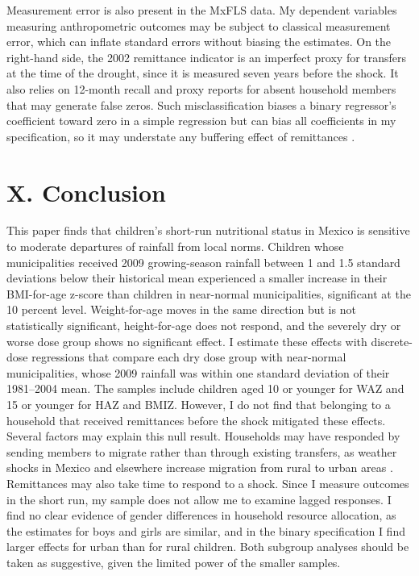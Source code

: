 \documentclass[12pt]{article}
\begin{document}
Measurement error is also present in the MxFLS data. My dependent variables measuring anthropometric outcomes may be subject to classical measurement error, which can inflate standard errors without biasing the estimates. On the right-hand side, the 2002 remittance indicator is an imperfect proxy for transfers at the time of the drought, since it is measured seven years before the shock. It also relies on 12-month recall and proxy reports for absent household members that may generate false zeros. Such misclassification biases a binary regressor's coefficient toward zero in a simple regression but can bias all coefficients in my specification, so it may understate any buffering effect of remittances \parencite{aignerRegressionBinaryIndependent1973}.

\section*{X. Conclusion}\label{sec:X}

This paper finds that children's short-run nutritional status in Mexico is sensitive to moderate departures of rainfall from local norms. Children whose municipalities received 2009 growing-season rainfall between 1 and 1.5 standard deviations below their historical mean experienced a smaller increase in their BMI-for-age z-score than children in near-normal municipalities, significant at the 10 percent level. Weight-for-age moves in the same direction but is not statistically significant, height-for-age does not respond, and the severely dry or worse dose group shows no significant effect. I estimate these effects with discrete-dose regressions that compare each dry dose group with near-normal municipalities, whose 2009 rainfall was within one standard deviation of their 1981--2004 mean. The samples include children aged 10 or younger for WAZ and 15 or younger for HAZ and BMIZ. However, I do not find that belonging to a household that received remittances before the shock mitigated these effects. Several factors may explain this null result. Households may have responded by sending members to migrate rather than through existing transfers, as weather shocks in Mexico and elsewhere increase migration from rural to urban areas \parencite{jessoeClimateChangeLabour2018,grogerInternalLaborMigration2016}. Remittances may also take time to respond to a shock. Since I measure outcomes in the short run, my sample does not allow me to examine lagged responses. I find no clear evidence of gender differences in household resource allocation, as the estimates for boys and girls are similar, and in the binary specification I find larger effects for urban than for rural children. Both subgroup analyses should be taken as suggestive, given the limited power of the smaller samples.
\end{document}

